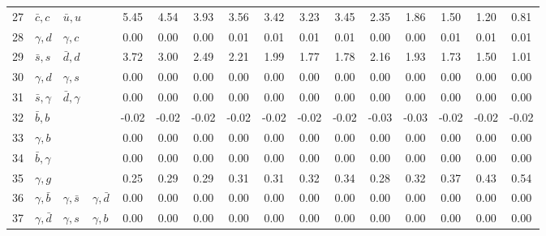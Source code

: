 \begin{tabularx}{\textwidth}{rXXX@{}S@{}S@{}S@{}S@{}S@{}S@{}S@{}S@{}S@{}S@{}S@{}S}
  27 & $\bar c,c$      & $\bar u, u$     &                 &  5.45 &  4.54 &  3.93 &  3.56 &  3.42 &  3.23 &  3.45 &  2.35 &  1.86 &  1.50 &  1.20 &  0.81 \\
  28 & $\gamma, d$     & $\gamma, c$     &                 &  0.00 &  0.00 &  0.00 &  0.01 &  0.01 &  0.01 &  0.01 &  0.00 &  0.00 &  0.01 &  0.01 &  0.01 \\
  29 & $\bar s,s$      & $\bar d, d$     &                 &  3.72 &  3.00 &  2.49 &  2.21 &  1.99 &  1.77 &  1.78 &  2.16 &  1.93 &  1.73 &  1.50 &  1.01 \\
  30 & $\gamma,d$      & $\gamma, s$     &                 &  0.00 &  0.00 &  0.00 &  0.00 &  0.00 &  0.00 &  0.00 &  0.00 &  0.00 &  0.00 &  0.00 &  0.00 \\
  31 & $\bar s,\gamma$ & $\bar d,\gamma$ &                 &  0.00 &  0.00 &  0.00 &  0.00 &  0.00 &  0.00 &  0.00 &  0.00 &  0.00 &  0.00 &  0.00 &  0.00 \\
  32 & $\bar b,b$      &                 &                 & -0.02 & -0.02 & -0.02 & -0.02 & -0.02 & -0.02 & -0.02 & -0.03 & -0.03 & -0.02 & -0.02 & -0.02 \\
  33 & $\gamma, b$     &                 &                 &  0.00 &  0.00 &  0.00 &  0.00 &  0.00 &  0.00 &  0.00 &  0.00 &  0.00 &  0.00 &  0.00 &  0.00 \\ 
  34 & $\bar b,\gamma$ &                 &                 &  0.00 &  0.00 &  0.00 &  0.00 &  0.00 &  0.00 &  0.00 &  0.00 &  0.00 &  0.00 &  0.00 &  0.00 \\   
  35 & $\gamma,g$      &                 &                 &  0.25 &  0.29 &  0.29 &  0.31 &  0.31 &  0.32 &  0.34 &  0.28 &  0.32 &  0.37 &  0.43 &  0.54 \\
  36 & $\gamma,\bar b$ & $\gamma,\bar s$ & $\gamma,\bar d$ &  0.00 &  0.00 &  0.00 &  0.00 &  0.00 &  0.00 &  0.00 &  0.00 &  0.00 &  0.00 &  0.00 &  0.00 \\
  37 & $\gamma,\bar d$ & $\gamma,s$      & $\gamma,b$      &  0.00 &  0.00 &  0.00 &  0.00 &  0.00 &  0.00 &  0.00 &  0.00 &  0.00 &  0.00 &  0.00 &  0.00 \\  
  \bottomrule
\end{tabularx}
